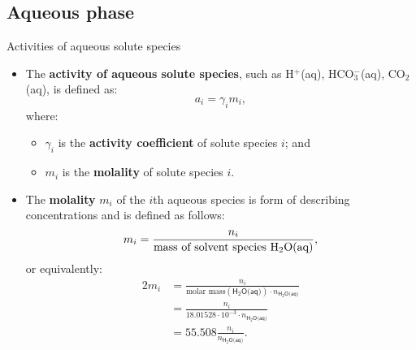 \subsection{Aqueous phase}
%
%
%
\begin{frame}{Activities of aqueous solute species}
%
\lcol
\begin{itemize}
\item The \alert{\textbf{activity of aqueous solute species}}, such as H$^{+}$(aq), HCO$_{3}^{-}$(aq),
CO$_{2}$(aq), is defined as:
\[
a_{i}=\gamma_{i}m_{i},
\]
where:
\begin{itemize}
\item $\gamma_{i}$ is the \textbf{activity coefficient} of solute species
$i$; and
\item $m_{i}$ is the \textbf{molality} of solute species $i$.	
\end{itemize}
\end{itemize}
\rcol
\pause
\begin{itemize}
\item The  \alert{\textbf{molality}} $m_{i}$ of the $i$th aqueous species is form of describing concentrations and is defined as follows:
\[
m_{i}=\frac{n_{i}}{\text{mass of solvent species H\ensuremath{_{2}}O(aq)}},
\]
or equivalently:
\begin{alignat*}{2}
m_{i} & =  \frac{n_{i}}{\mbox{molar mass}(\mathsf{H_{2}O\text{(aq)}}) \cdot n_{\mathsf{H_{2}O\text{(aq)}}}} \\
         & =  \frac{n_{i}}{18.01528 \cdot 10^{-3} \cdot  n_{\mathsf{H_{2}O\text{(aq)}}}} \\
         & = 55.508\frac{n_{i}}{n_{\mathsf{H_{2}O\text{(aq)}}}}.
\end{alignat*}
\end{itemize}
\ecol
\end{frame}
%
%
